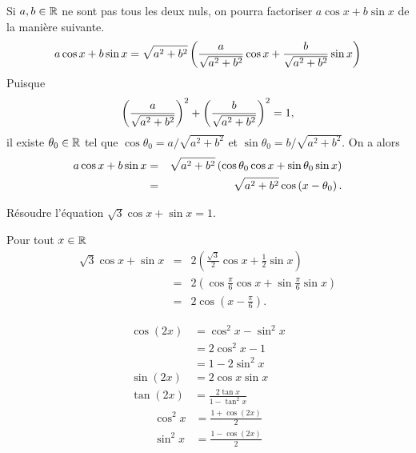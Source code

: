 \documentclass{magnolia}
\begin{document}
\begin{remarqueUnique}
\remarque Si $a,b\in\mathbb{R}$ ne sont pas tous les deux nuls, on pourra factoriser
  $a\cos x+b\sin x$ de la manière suivante.
  \[a\cos x+b\sin x=\sqrt{a^2+b^2}\left(\frac{a}{\sqrt{a^2+b^2}}\cos x+
                      \frac{b}{\sqrt{a^2+b^2}}\sin x\right)\]
  Puisque
  \[\left(\frac{a}{\sqrt{a^2+b^2}}\right)^2+\left(\frac{b}{\sqrt{a^2+b^2}}\right)^2=1,\]
  il existe $\theta_0\in\mathbb{R}$ tel que $\cos\theta_0=a/\sqrt{a^2+b^2}$ et
  $\sin\theta_0=b/\sqrt{a^2+b^2}$. On a alors
  \begin{eqnarray*}
  a\cos x+b\sin x &=& \sqrt{a^2+b^2}\left(\cos\theta_0\cos x+\sin\theta_0\sin x\right)\\
                  &=& \sqrt{a^2+b^2}\cos\left(x-\theta_0\right).
  \end{eqnarray*}
\end{remarqueUnique}

\begin{exoUnique}
\exo Résoudre l'équation $\sqrt{3}\cos x+\sin x=1$.
\begin{sol}
Pour tout $x\in\mathbb{R}$
\begin{eqnarray*}
\sqrt{3}\cos x+\sin x
&=& 2\left(\frac{\sqrt{3}}{2}\cos x+\frac{1}{2}\sin x \right)\\
&=& 2\left( \cos \frac{\pi}{6}\cos x+\sin \frac{\pi}{6}\sin x \right)\\
&=& 2\cos\left( x-\frac{\pi}{6}\right).
\end{eqnarray*}
\end{sol}
\end{exoUnique}

\begin{proposition}[utile=-3, nom={Angle double}]
\begin{align*}
\cos(2x)&=\cos^2 x-\sin^2 x\\
        &=2\cos^2 x-1\\
        &=1-2\sin^2 x\\
\sin(2x)&=2\cos x\sin x\\
\tan(2x)&=\frac{2\tan x}{1-\tan^2 x}
\end{align*}
\begin{align*}
\cos^2 x &=\frac{1+\cos(2x)}{2}\\
\sin^2 x &=\frac{1-\cos(2x)}{2}
\end{align*}
\end{proposition}
\end{document}
